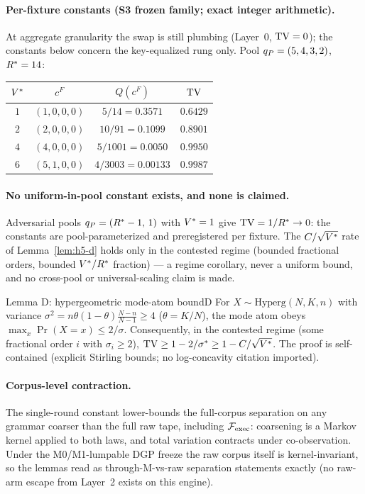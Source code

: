 \paragraph{Per-fixture constants (S3 frozen family; exact integer
arithmetic).} At aggregate granularity the swap is still plumbing
(Layer~0, $\operatorname{TV} = 0$); the constants below concern the key-equalized rung
only. Pool $q_{P} = (5,4,3,2)$, $R^{*} = 14$:
\begin{center}
\begin{tabular}{c c c c}
$V^{*}$ & $c^{F}$ & $Q(c^{F})$ & $\operatorname{TV}$ \\
\hline
$1$ & $(1,0,0,0)$ & $5/14 = 0.3571$ & $0.6429$ \\
$2$ & $(2,0,0,0)$ & $10/91 = 0.1099$ & $0.8901$ \\
$4$ & $(4,0,0,0)$ & $5/1001 = 0.0050$ & $0.9950$ \\
$6$ & $(5,1,0,0)$ & $4/3003 = 0.00133$ & $0.9987$
\end{tabular}
\end{center}

\paragraph{No uniform-in-pool constant exists, and none is claimed.}
Adversarial pools $q_{P} = (R^{*} - 1,\, 1)$ with $V^{*} = 1$ give
$\operatorname{TV} = 1/R^{*} \to 0$: the constants are pool-parameterized and
preregistered per fixture. The $C/\sqrt{V^{*}}$ rate of
Lemma~\ref{lem:h5-d} holds only in the contested regime (bounded fractional
orders, bounded $V^{*}/R^{*}$ fraction) --- a regime corollary, never a
uniform bound, and no cross-pool or universal-scaling claim is made.

\begin{preregthm}{Lemma D: hypergeometric mode-atom bound}{D}
\label{lem:h5-d}
For $X \sim \mathrm{Hyperg}(N, K, n)$ with variance
$\sigma^2 = n\theta(1-\theta)\frac{N-n}{N-1} \ge 4$ ($\theta = K/N$), the
mode atom obeys $\max_x \Pr(X = x) \le 2/\sigma$. Consequently, in the
contested regime (some fractional order $i$ with $\sigma_i \ge 2$),
$\operatorname{TV} \ge 1 - 2/\sigma^{*} \ge 1 - C/\sqrt{V^{*}}$. The proof is
self-contained (explicit Stirling bounds; no log-concavity citation
imported).
\end{preregthm}


\paragraph{Corpus-level contraction.} The single-round constant lower-bounds
the full-corpus separation on any grammar coarser than the full raw tape,
including $\mathcal{F}_{\mathrm{exec}}$: coarsening is a Markov kernel applied to both laws, and
total variation contracts under co-observation. Under the M0/M1-lumpable DGP
freeze the raw corpus itself is kernel-invariant, so the lemmas read as
through-M-vs-raw separation statements exactly (no raw-arm escape from
Layer~2 exists on this engine).

